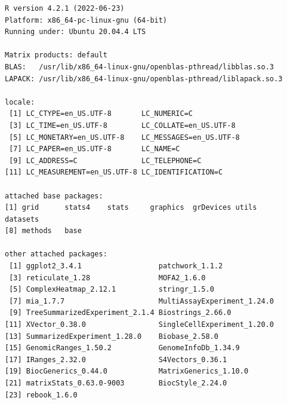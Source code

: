 \documentclass[
]{book}
\begin{document}
\begin{verbatim}
R version 4.2.1 (2022-06-23)
Platform: x86_64-pc-linux-gnu (64-bit)
Running under: Ubuntu 20.04.4 LTS

Matrix products: default
BLAS:   /usr/lib/x86_64-linux-gnu/openblas-pthread/libblas.so.3
LAPACK: /usr/lib/x86_64-linux-gnu/openblas-pthread/liblapack.so.3

locale:
 [1] LC_CTYPE=en_US.UTF-8       LC_NUMERIC=C              
 [3] LC_TIME=en_US.UTF-8        LC_COLLATE=en_US.UTF-8    
 [5] LC_MONETARY=en_US.UTF-8    LC_MESSAGES=en_US.UTF-8   
 [7] LC_PAPER=en_US.UTF-8       LC_NAME=C                 
 [9] LC_ADDRESS=C               LC_TELEPHONE=C            
[11] LC_MEASUREMENT=en_US.UTF-8 LC_IDENTIFICATION=C       

attached base packages:
[1] grid      stats4    stats     graphics  grDevices utils     datasets 
[8] methods   base     

other attached packages:
 [1] ggplot2_3.4.1                  patchwork_1.1.2               
 [3] reticulate_1.28                MOFA2_1.6.0                   
 [5] ComplexHeatmap_2.12.1          stringr_1.5.0                 
 [7] mia_1.7.7                      MultiAssayExperiment_1.24.0   
 [9] TreeSummarizedExperiment_2.1.4 Biostrings_2.66.0             
[11] XVector_0.38.0                 SingleCellExperiment_1.20.0   
[13] SummarizedExperiment_1.28.0    Biobase_2.58.0                
[15] GenomicRanges_1.50.2           GenomeInfoDb_1.34.9           
[17] IRanges_2.32.0                 S4Vectors_0.36.1              
[19] BiocGenerics_0.44.0            MatrixGenerics_1.10.0         
[21] matrixStats_0.63.0-9003        BiocStyle_2.24.0              
[23] rebook_1.6.0                  


\end{verbatim}
\end{document}
